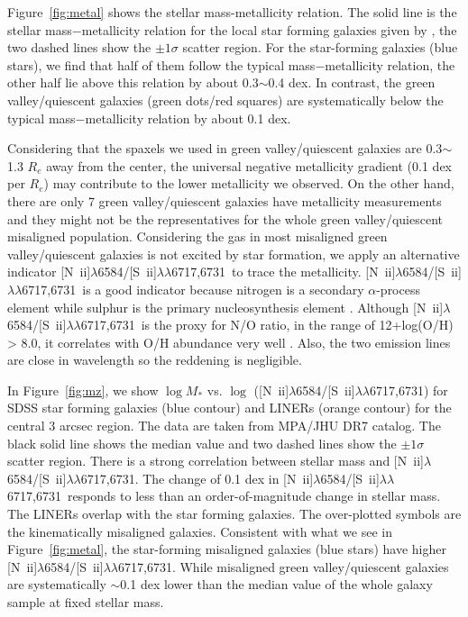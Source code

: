 \documentclass[a4paper,fleqn,usenatbib]{mnras}
\newcommand{\nii}{[{N~\sc ii}]$\lambda$6584}
\newcommand{\sii}{[{S~\sc ii}]$\lambda\lambda$6717,6731}
\begin{document}
Figure~\ref{fig:metal} shows the stellar mass-metallicity relation. The solid line is the stellar mass$-$metallicity relation for the local star forming galaxies given by \cite{Tremonti-04}, the two dashed lines show the $\pm1\sigma$ scatter region. For the star-forming galaxies (blue stars), we find that half of them follow the typical mass$-$metallicity relation, the other half lie above this relation by 
about 0.3$\sim$0.4 dex. In contrast, the green valley/quiescent galaxies (green dots/red squares) are systematically below the typical mass$-$metallicity relation by about 0.1 dex.

Considering that the spaxels we used in green valley/quiescent galaxies are 0.3$\sim$1.3 $R_e$ away from the center, the universal negative metallicity gradient (0.1 dex per $R_e$) may contribute to the lower metallicity we observed.  
On the other hand, there are only 7 green valley/quiescent galaxies have metallicity measurements and they might not be the representatives for the whole green valley/quiescent misaligned population. Considering the gas in most misaligned green valley/quiescent galaxies is not excited by star formation, we apply an alternative indicator \nii/\sii\ to trace the metallicity. \nii/\sii\ is a good indicator because nitrogen is a secondary $\alpha$-process element while sulphur is the primary nucleosynthesis element \citep{kewley-2002, dopita-2013}. 
Although \nii/\sii\ is the proxy for N/O ratio, in the range of 12+log(O/H) > 8.0, it correlates with O/H abundance very well \citep{dopita-2016, kashino-2016}. Also, the two emission lines are close in wavelength so the reddening is negligible.

In Figure~\ref{fig:mz}, we show $\log M_*$ vs. $\log$ (\nii/\sii) for SDSS star forming galaxies (blue contour) and LINERs (orange contour) for the central 3 arcsec region. The data are taken from MPA/JHU DR7 catalog. The black solid line shows the median value and two dashed lines show the $\pm1\sigma$ scatter region. There is a strong correlation between stellar mass and \nii/\sii. The change of 0.1 dex in \nii/\sii\ responds to less than an order-of-magnitude change in stellar mass. The LINERs overlap with the star forming galaxies. The over-plotted symbols are the kinematically misaligned galaxies. Consistent with what we see in Figure~\ref{fig:metal}, the star-forming misaligned galaxies (blue stars) have higher \nii/\sii. While misaligned green valley/quiescent galaxies are systematically $\sim$0.1 dex lower than the median value of the whole galaxy sample at fixed stellar mass.
\end{document}
